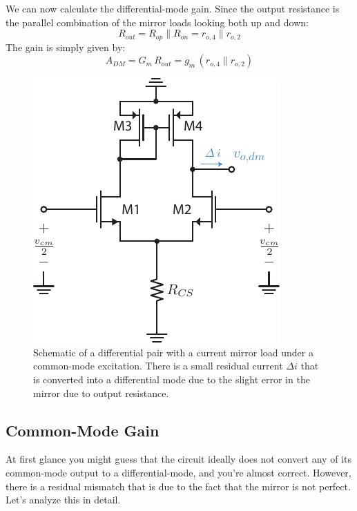 We can now calculate the differential-mode gain.  Since the output resistance is the parallel combination of the mirror loads looking both up and down:
    \begin{equation}
        R_{out} = R_{op} \parallel R_{on} = r_{o,4} \parallel r_{o,2}
    \end{equation}
The gain is simply given by:
    \begin{equation}
        A_{DM} = G_m\,R_{out} = g_m\,\left(r_{o,4} \parallel r_{o,2}\right)
    \end{equation}
\begin{figure}[t]
\centering
\includegraphics[scale=1]{Diffpair_se_cmgain}
\caption{Schematic of a differential pair with a current mirror load under a common-mode excitation.  There is a small residual current $\Delta i$ that is converted into a differential mode due to the slight error in the mirror due to output resistance.}
\label{fig:Diffpair_se_cmgain}
\end{figure}
\subsection{Common-Mode Gain}
At first glance you might guess that the circuit ideally does not convert any of its common-mode output to a differential-mode, and you're almost correct.  However, there is a residual mismatch that is due to the fact that the mirror is not perfect.  Let's analyze this in detail.

